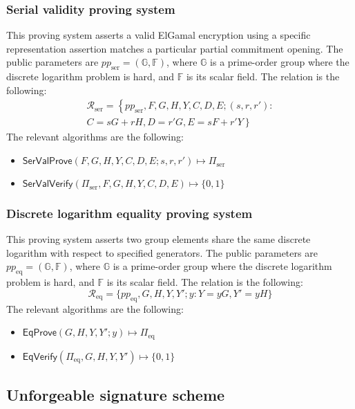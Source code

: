 \documentclass{article}
\newcommand{\G}{\mathbb{G}}
\newcommand{\F}{\mathbb{F}}
\newcommand{\func}[1]{\mathsf{#1}}
\begin{document}
\subsubsection{Serial validity proving system}

This proving system asserts a valid ElGamal encryption using a specific representation assertion matches a particular partial commitment opening.
The public parameters are $pp_{\text{ser}} = (\G, \F)$, where $\G$ is a prime-order group where the discrete logarithm problem is hard, and $\F$ is its scalar field.
The relation is the following:
\begin{multline*}
\mathcal{R}_{\text{ser}} = \left\{ pp_{\text{ser}}, F, G, H, Y, C, D, E ; (s, r, r') : \right. \\
\left. C = sG + rH, D = r'G, E = sF + r'Y \right\}
\end{multline*}
The relevant algorithms are the following:
\begin{itemize}
    \item $\func{SerValProve}(F, G, H, Y, C, D, E ; s, r, r') \mapsto \Pi_{\text{ser}}$
    \item $\func{SerValVerify}(\Pi_{\text{ser}}, F, G, H, Y, C, D, E) \mapsto \{0, 1\}$
\end{itemize}


\subsubsection{Discrete logarithm equality proving system}

This proving system asserts two group elements share the same discrete logarithm with respect to specified generators.
The public parameters are $pp_{\text{eq}} = (\G, \F)$, where $\G$ is a prime-order group where the discrete logarithm problem is hard, and $\F$ is its scalar field.
The relation is the following:
$$\mathcal{R}_{\text{eq}} = \{ pp_{\text{eq}}, G, H, Y, Y' ; y : Y = yG, Y' = yH \}$$
The relevant algorithms are the following:
\begin{itemize}
    \item $\func{EqProve}(G, H, Y, Y' ; y) \mapsto \Pi_{\text{eq}}$
    \item $\func{EqVerify}(\Pi_{\text{eq}}, G, H, Y, Y') \mapsto \{0, 1\}$
\end{itemize}


\subsection{Unforgeable signature scheme}
\end{document}
